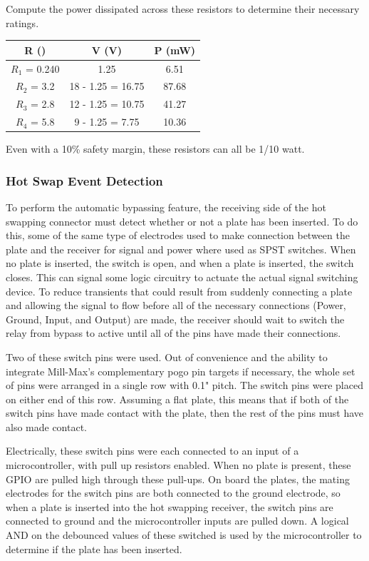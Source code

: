 		Compute the power dissipated across these resistors to determine their necessary ratings.

		\begin{center}
		\begin{tabular}{c c|c}
			R (\kohm) & V (V) & P (mW) \\
			\hline
			$R_1$ = 0.240 & 1.25 & 6.51 \\
			$R_2$ = 3.2 & 18 - 1.25 = 16.75 & 87.68 \\
			$R_3$ = 2.8 & 12 - 1.25 = 10.75 & 41.27 \\
			$R_4$ = 5.8 & 9 - 1.25 = 7.75 & 10.36
		\end{tabular}
		\end{center}

		Even with a 10\% safety margin, these resistors can all be 1/10 watt.

		\subsubsection{Hot Swap Event Detection}

		To perform the automatic bypassing feature, the receiving side of the hot swapping connector must detect whether or not a plate has been inserted. To do this, some of the same type of electrodes used to make connection between the plate and the receiver for signal and power where used as SPST switches.  When no plate is inserted, the switch is open, and when a plate is inserted, the switch closes. This can signal some logic circuitry to actuate the actual signal switching device.  To reduce transients that could result from suddenly connecting a plate and allowing the signal to flow before all of the necessary connections (Power, Ground, Input, and Output) are made, the receiver should wait to switch the relay from bypass to active until all of the pins have made their connections.

		Two of these switch pins were used.  Out of convenience and the ability to integrate Mill-Max's complementary pogo pin targets if necessary, the whole set of pins were arranged in a single row with 0.1" pitch.  The switch pins were placed on either end of this row.  Assuming a flat plate, this means that if both of the switch pins have made contact with the plate, then the rest of the pins must have also made contact.

		Electrically, these switch pins were each connected to an input of a microcontroller, with pull up resistors enabled.  When no plate is present, these GPIO are pulled high through these pull-ups.  On board the plates, the mating electrodes for the switch pins are both connected to the ground electrode, so when a plate is inserted into the hot swapping receiver, the switch pins are connected to ground and the microcontroller inputs are pulled down.  A logical AND on the debounced values of these switched is used by the microcontroller to determine if the plate has been inserted.

